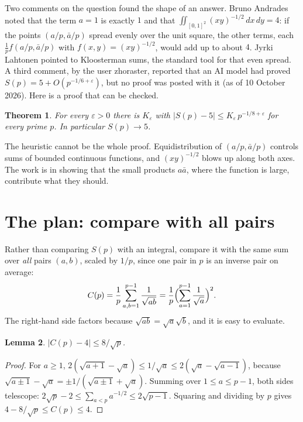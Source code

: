 \documentclass[11pt]{amsart}
\newtheorem{theorem}{Theorem}
\newtheorem{lemma}[theorem]{Lemma}
\theoremstyle{remark}
\begin{document}
Two comments on the question found the shape of an answer. Bruno Andrades noted that the term $a=1$ is exactly $1$ and that $\iint_{[0,1]^2}(xy)^{-1/2}\,dx\,dy=4$: if the points $(a/p,\bar a/p)$ spread evenly over the unit square, the other terms, each $\frac1pf(a/p,\bar a/p)$ with $f(x,y)=(xy)^{-1/2}$, would add up to about $4$. Jyrki Lahtonen pointed to Kloosterman sums, the standard tool for that even spread. A third comment, by the user zhoraster, reported that an AI model had proved $S(p)=5+O(p^{-1/6+\varepsilon})$, but no proof was posted with it (as of 10 October 2026). Here is a proof that can be checked.

\begin{theorem}\label{thm:five}
For every $\varepsilon>0$ there is $K_\varepsilon$ with $|S(p)-5|\le K_\varepsilon\,p^{-1/8+\varepsilon}$ for every prime $p$. In particular $S(p)\to5$.
\end{theorem}

The heuristic cannot be the whole proof. Equidistribution of $(a/p,\bar a/p)$ controls sums of bounded continuous functions, and $(xy)^{-1/2}$ blows up along both axes. The work is in showing that the small products $a\bar a$, where the function is large, contribute what they should.

\section{The plan: compare with all pairs}

Rather than comparing $S(p)$ with an integral, compare it with the same sum over \emph{all} pairs $(a,b)$, scaled by $1/p$, since one pair in $p$ is an inverse pair on average:
\begin{equation}\label{eq:C}
C(p)=\frac1p\sum_{a,b=1}^{p-1}\frac1{\sqrt{ab}}=\frac1p\Bigl(\sum_{a=1}^{p-1}\frac1{\sqrt a}\Bigr)^2 .
\end{equation}
The right-hand side factors because $\sqrt{ab}=\sqrt a\sqrt b$, and it is easy to evaluate.

\begin{lemma}\label{lem:grid}
$|C(p)-4|\le8/\sqrt p$.
\end{lemma}

\begin{proof}
For $a\ge1$, $2(\sqrt{a+1}-\sqrt a)\le1/\sqrt a\le2(\sqrt a-\sqrt{a-1})$, because $\sqrt{a\pm1}-\sqrt a=\pm1/(\sqrt{a\pm1}+\sqrt a)$. Summing over $1\le a\le p-1$, both sides telescope: $2\sqrt p-2\le\sum_{a<p}a^{-1/2}\le2\sqrt{p-1}$. Squaring and dividing by $p$ gives $4-8/\sqrt p\le C(p)\le4$.
\end{proof}
\end{document}
